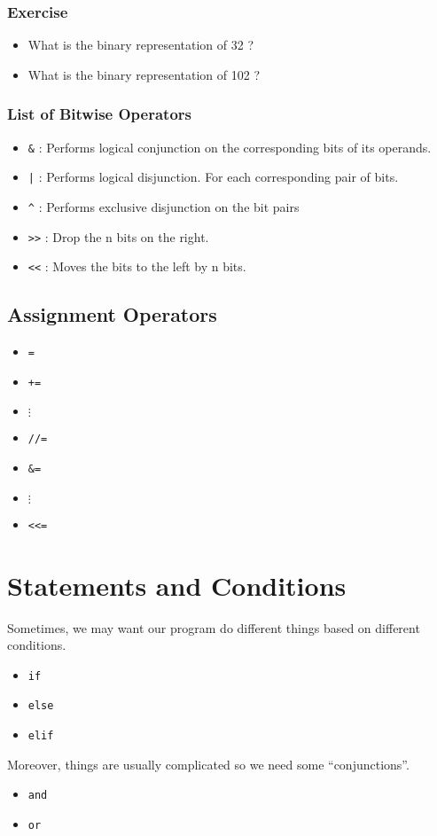 \documentclass[12pt]{article}
\begin{document}
\begin{CJK*}{UTF8}{bkai}
\subsubsection*{Exercise}
\begin{itemize}
    \item What is the binary representation of 32 ?
    \vskip 150pt
    \item What is the binary representation of 102 ?
    \vskip 150pt
\end{itemize}
\newpage
\setcounter{subsubsection}{0}
\subsubsection{List of Bitwise Operators}
\begin{itemize}
    \item \texttt{\&} :
    Performs logical conjunction on the corresponding bits of its operands.
    \item \texttt{|} : 
    Performs logical disjunction. For each corresponding pair of bits. 
    \item \texttt{\^} :
    Performs exclusive disjunction on the bit pairs
    \item \texttt{>>} :
    Drop the n bits on the right. 
    \item \texttt{<<} :
    Moves the bits to the left by n bits. 
\end{itemize}
\subsection{Assignment Operators}
\begin{itemize}
    \item \texttt{=}
    \item \texttt{+=}
    \item $\vdots$
    \item \texttt{//=}
    \item \texttt{\&=}
    \item $\vdots$
    \item \texttt{<<=}
\end{itemize}
\section{Statements and Conditions}
Sometimes, we may want our program do different things based on different conditions.
\begin{itemize}
    \item \texttt{if}
    \item \texttt{else}
    \item \texttt{elif}
\end{itemize}
Moreover, things are usually complicated so we need some ``conjunctions''.
\begin{itemize}
    \item \texttt{and}
    \item \texttt{or}
\end{itemize}

\end{CJK*}
\end{document}
